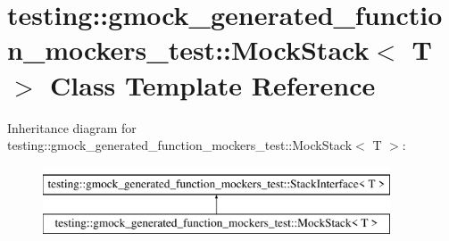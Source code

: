 \hypertarget{classtesting_1_1gmock__generated__function__mockers__test_1_1MockStack}{}\section{testing\+::gmock\+\_\+generated\+\_\+function\+\_\+mockers\+\_\+test\+::Mock\+Stack$<$ T $>$ Class Template Reference}
\label{classtesting_1_1gmock__generated__function__mockers__test_1_1MockStack}
Inheritance diagram for testing\+::gmock\+\_\+generated\+\_\+function\+\_\+mockers\+\_\+test\+::Mock\+Stack$<$ T $>$\+:\begin{figure}[H]
\begin{center}
\leavevmode
\includegraphics[height=2.000000cm]{classtesting_1_1gmock__generated__function__mockers__test_1_1MockStack}
\end{center}
\end{figure}
